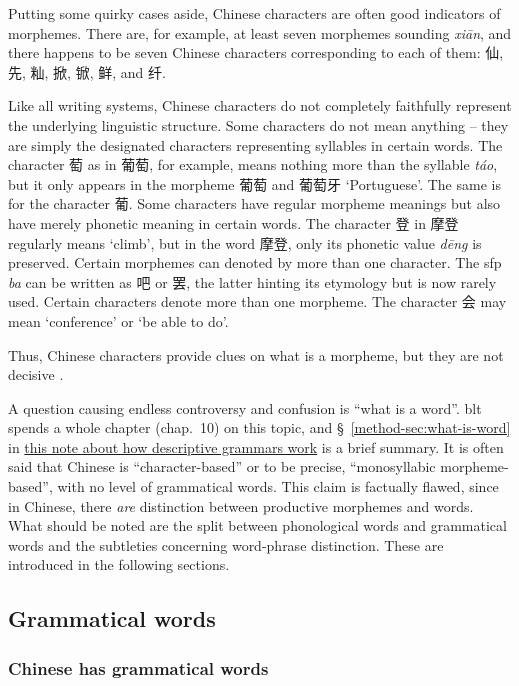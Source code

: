 \documentclass[UTF8, a4paper, oneside, scheme=plain]{ctexart}
\newcommand*{\citesec}[1]{\S~{#1}}
\newcommand*{\citechap}[1]{chap.~{#1}}
\newcommand*{\term}[1]{\emph{#1}}
\newcommand{\corpus}[1]{\emph{#1}}
\newcommand{\method}{\href{../methodology/glossing.pdf}{this note about how descriptive grammars work}}
\newcommand{\translate}[1]{`#1'}
\begin{document}
Putting some quirky cases aside,
Chinese characters are often good indicators of morphemes.
There are, for example, at least seven morphemes sounding \corpus{xi\={a}n},
and there happens to be seven Chinese characters corresponding to each of them:
仙, 先, 籼, 掀, 锨, 鲜, and 纤.

Like all writing systems, 
Chinese characters do not completely faithfully represent 
the underlying linguistic structure.
Some characters do not mean anything -- 
they are simply the designated characters representing syllables in certain words.
The character 萄 as in 葡萄, for example, 
means nothing more than the syllable \corpus{t\'{a}o},
but it only appears in the morpheme 葡萄 and 葡萄牙 \translate{Portuguese}.
The same is for the character 葡.
Some characters have regular morpheme meanings
but also have merely phonetic meaning in certain words.
The character 登 in 摩登 regularly means \translate{climb},
but in the word 摩登, only its phonetic value \corpus{d\={e}ng} is preserved.
Certain morphemes can denoted by more than one character.
The \ac{sfp} \corpus{ba} can be written as 吧 or 罢,
the latter hinting its etymology but is now rarely used.
Certain characters denote more than one morpheme.
The character 会 may mean \translate{conference} or \translate{be able to do}. 

Thus, Chinese characters provide clues on what is a morpheme,
but they are not decisive \citep[1.1.4]{zhudexigrammar}.

A question causing endless controversy and confusion 
is ``what is a word''. 
\ac{blt} spends a whole chapter (\citechap{10}) on this topic,
and \citesec{\ref{method-sec:what-is-word}} in \method{}
is a brief summary. 
It is often said that Chinese is ``character-based''
or to be precise, ``monosyllabic morpheme-based'',
with no level of grammatical words.
This claim is factually flawed, 
since in Chinese, there \term{are} distinction between 
productive morphemes and words.
What should be noted are the split between phonological words and grammatical words %
and the subtleties concerning word-phrase distinction. %
These are introduced in the following sections.

\subsection{Grammatical words}\label{sec:grammatical-word}

\subsubsection{Chinese has grammatical words}
\end{document}
